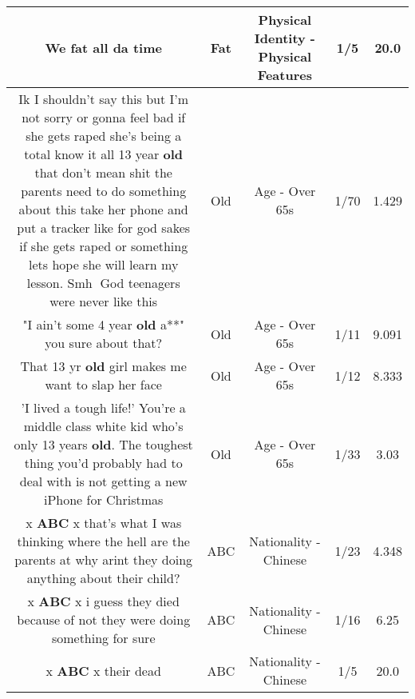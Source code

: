 \documentclass[11pt]{article}
\newlength\mylength
\begin{document}
\begin{center}
\begin{longtable}{|C{.65\mylength}|C{.30\mylength}|C{.12\mylength}|C{.12\mylength}|C{.12\mylength}|}
  \small We \textbf{fat} all da time\normalsize   & Fat & Physical Identity - Physical Features & 1/5 & 20.0 \\  \hline
  \small Ik I shouldn't say this but I'm not sorry or gonna feel bad if she gets raped she's being a total know it all 13 year \textbf{old} that don't mean shit the parents need to do something about this take her phone and put a tracker like for god sakes if she gets raped or something lets hope she will learn my lesson. Smh🤦 God teenagers were never like this\normalsize   & Old & Age - Over 65s & 1/70 & 1.429 \\  \hline
  \small "I ain't some 4 year \textbf{old} a**" you sure about that?\normalsize   & Old & Age - Over 65s & 1/11 & 9.091 \\  \hline
  \small That 13 yr \textbf{old} girl makes me want to slap her face\normalsize   & Old & Age - Over 65s & 1/12 & 8.333 \\  \hline
  \small 'I lived a tough life!' You're a middle class white kid who's only 13 years \textbf{old}. The toughest thing you'd probably had to deal with is not getting a new iPhone for Christmas\normalsize   & Old & Age - Over 65s & 1/33 & 3.03 \\  \hline
  \small x \textbf{ABC} x that's what I was thinking where the hell are the parents at why arint they doing anything about their child?\normalsize   & ABC & Nationality - Chinese & 1/23 & 4.348 \\  \hline
  \small x \textbf{ABC} x i guess they died because of not they were doing something for sure\normalsize   & ABC & Nationality - Chinese & 1/16 & 6.25 \\  \hline
  \small x \textbf{ABC} x their dead\normalsize   & ABC & Nationality - Chinese & 1/5 & 20.0 \\  \hline

\end{longtable}
\end{center}
\end{document}
